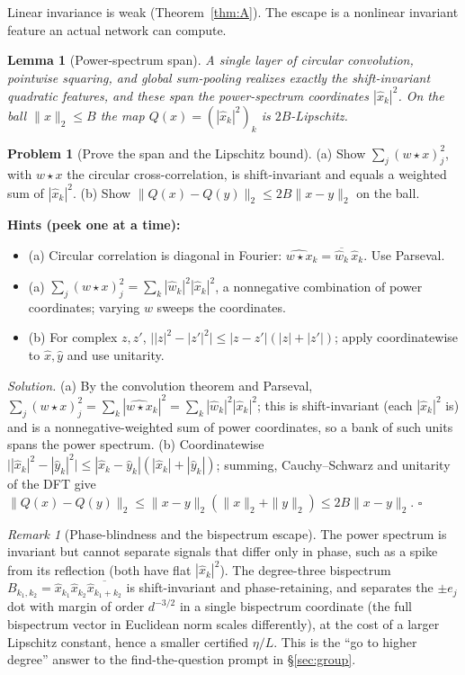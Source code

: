 \documentclass[11pt]{article}
\theoremstyle{plain}
\newtheorem{lemma}[theorem]{Lemma}
\theoremstyle{definition}
\newtheorem{problem}{Problem}[section]
\theoremstyle{remark}
\newtheorem{remark}[theorem]{Remark}
\newenvironment{hints}{\par\smallskip\noindent\textbf{\color{hintc}Hints (peek one at a time):}\begin{itemize}}{\end{itemize}\par\smallskip}
\newenvironment{solution}{\par\smallskip\noindent\textit{Solution.}\;}{\hfill$\square$\par\smallskip}
\begin{document}
Linear invariance is weak (Theorem~\ref{thm:A}). The escape is a nonlinear invariant feature an actual network can
compute.

\begin{lemma}[Power-spectrum span]\label{lem:ps}
A single layer of circular convolution, pointwise squaring, and global sum-pooling realizes exactly the
shift-invariant quadratic features, and these span the power-spectrum coordinates $|\hat x_k|^2$. On the ball
$\|x\|_2\le B$ the map $Q(x)=(|\hat x_k|^2)_k$ is $2B$-Lipschitz.
\end{lemma}

\begin{problem}[Prove the span and the Lipschitz bound]\label{pr:ps}
(a) Show $\sum_j (w\star x)_j^2$, with $w\star x$ the circular cross-correlation, is shift-invariant and equals a
weighted sum of $|\hat x_k|^2$. (b) Show $\|Q(x)-Q(y)\|_2\le 2B\|x-y\|_2$ on the ball.
\end{problem}
\begin{hints}
\item (a) Circular correlation is diagonal in Fourier: $\widehat{w\star x}_k=\overline{\hat w_k}\,\hat x_k$. Use Parseval.
\item (a) $\sum_j(w\star x)_j^2=\sum_k|\hat w_k|^2|\hat x_k|^2$, a nonnegative combination of power coordinates; varying $w$ sweeps the coordinates.
\item (b) For complex $z,z'$, $\big||z|^2-|z'|^2\big|\le|z-z'|(|z|+|z'|)$; apply coordinatewise to $\hat x,\hat y$ and use unitarity.
\end{hints}
\begin{solution}
(a) By the convolution theorem and Parseval, $\sum_j(w\star x)_j^2=\sum_k|\widehat{w\star x}_k|^2=\sum_k|\hat w_k|^2|\hat x_k|^2$;
this is shift-invariant (each $|\hat x_k|^2$ is) and is a nonnegative-weighted sum of power coordinates, so a bank of
such units spans the power spectrum. (b) Coordinatewise $\big||\hat x_k|^2-|\hat y_k|^2\big|\le|\hat x_k-\hat y_k|(|\hat x_k|+|\hat y_k|)$;
summing, Cauchy--Schwarz and unitarity of the DFT give $\|Q(x)-Q(y)\|_2\le\|x-y\|_2(\|x\|_2+\|y\|_2)\le2B\|x-y\|_2$.
\end{solution}

\begin{remark}[Phase-blindness and the bispectrum escape]
The power spectrum is invariant but cannot separate signals that differ only in phase, such as a spike from its
reflection (both have flat $|\hat x_k|^2$). The degree-three bispectrum $B_{k_1,k_2}=\hat x_{k_1}\hat x_{k_2}\overline{\hat x_{k_1+k_2}}$
is shift-invariant and phase-retaining, and separates the $\pm e_j$ dot with margin of order $d^{-3/2}$ in a single
bispectrum coordinate (the full bispectrum vector in Euclidean norm scales differently), at the cost of a larger
Lipschitz constant, hence a smaller certified $\eta/L$. This is the ``go to higher degree'' answer to the
find-the-question prompt in \S\ref{sec:group}.
\end{remark}
\end{document}
